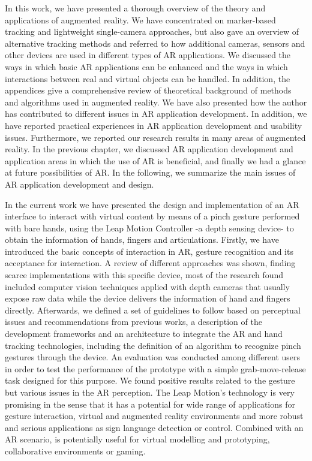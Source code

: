 


In this work, we have presented a thorough overview of the theory and applications of augmented reality. We have concentrated on marker-based tracking and lightweight single-camera approaches, but also gave an overview of alternative tracking methods and referred to how additional cameras, sensors and other devices are used in different types of AR applications. We discussed the ways in which basic AR applications can be enhanced and the ways in which interactions between real and virtual objects can be handled. In addition, the appendices give a comprehensive review of theoretical background of methods and algorithms used in augmented reality. We have also presented how the author has contributed to different issues in AR application development. In addition, we have reported practical experiences in AR application development and usability issues. Furthermore, we reported our research results in many areas of augmented reality. In the previous chapter, we discussed AR application development and application areas in which the use of AR is beneficial, and finally we had a glance at future possibilities of AR. In the following, we summarize the main issues of AR application development and design.

In the current work we have presented the design and implementation of an AR interface to interact with virtual content by means of a pinch gesture performed with bare hands, using the Leap Motion Controller -a depth sensing device- to obtain the information of hands, fingers and articulations. Firstly, we have introduced the basic concepts of interaction in AR, gesture recognition and its acceptance for interaction. A review of different approaches was shown, finding scarce implementations with this specific device, most of the research found included computer vision techniques applied with depth cameras that usually expose raw data while the device delivers the information of hand and fingers directly. Afterwards, we defined a set of guidelines to follow based on perceptual issues and recommendations from previous works, a description of the development frameworks and an architecture to integrate the AR and hand tracking technologies, including the definition of an algorithm to recognize pinch gestures through the device. An evaluation was conducted among different users in order to test the performance of the prototype with a simple grab-move-release task designed for this purpose. We found positive results related to the gesture but various issues in the AR perception. The Leap Motion’s technology is very promising in the sense that it has a potential for wide range of applications for gesture interaction, virtual and augmented reality environments and more robust and serious applications as sign language detection or control. Combined with an AR scenario, is potentially useful for virtual modelling and prototyping, collaborative environments or gaming.

